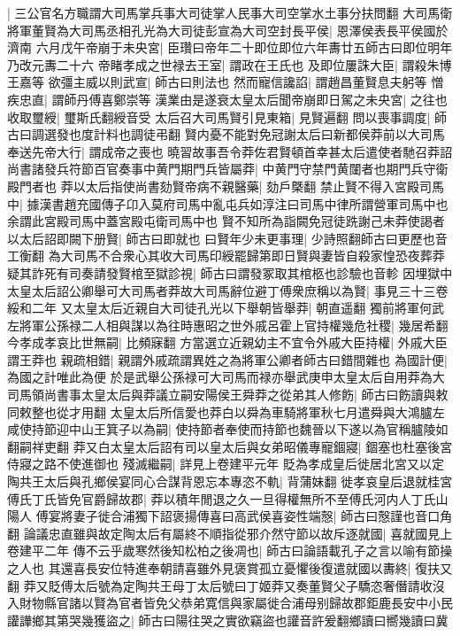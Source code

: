 |{
	三公官名方職謂大司馬掌兵事大司徒掌人民事大司空掌水土事分扶問翻}
大司馬衛將軍董賢為大司馬丞相孔光為大司徒彭宣為大司空封長平侯|{
	恩澤侯表長平侯國於濟南}
六月戊午帝崩于未央宮|{
	臣瓚曰帝年二十即位即位六年夀廿五師古曰即位明年乃改元夀二十六}
帝睹孝成之世禄去王室|{
	謂政在王氏也}
及即位屢誅大臣|{
	謂殺朱博王嘉等}
欲彊主威以則武宣|{
	師古曰則法也}
然而寵信讒諂|{
	謂趙昌董賢息夫躬等}
憎疾忠直|{
	謂師丹傅喜鄭崇等}
漢業由是遂衰太皇太后聞帝崩即日駕之未央宮|{
	之往也}
收取璽綬|{
	璽斯氏翻綬音受}
太后召大司馬賢引見東箱|{
	見賢遍翻}
問以喪事調度|{
	師古曰調選發也度計料也調徒弔翻}
賢内憂不能對免冠謝太后曰新都侯莽前以大司馬奉送先帝大行|{
	謂成帝之喪也}
曉習故事吾令莽佐君賢頓首幸甚太后遣使者馳召莽詔尚書諸發兵符節百官奏事中黄門期門兵皆屬莽|{
	中黄門守禁門黄闥者也期門兵守衛殿門者也}
莽以太后指使尚書劾賢帝病不親醫藥|{
	劾戶槩翻}
禁止賢不得入宮殿司馬中|{
	據漢書趙充國傳子卬入莫府司馬中亂屯兵如淳注曰司馬中律所謂營軍司馬中也余謂此宮殿司馬中蓋宮殿屯衛司馬中也}
賢不知所為詣闕免冠徒跣謝己未莽使謁者以太后詔即闕下册賢|{
	師古曰即就也}
曰賢年少未更事理|{
	少詩照翻師古曰更歷也音工衡翻}
為大司馬不合衆心其收大司馬印綬罷歸第即日賢與妻皆自殺家惶恐夜葬莽疑其詐死有司奏請發賢棺至獄診視|{
	師古曰謂發冢取其棺柩也診驗也音軫}
因埋獄中太皇太后詔公卿舉可大司馬者莽故大司馬辭位避丁傅衆庶稱以為賢|{
	事見三十三卷綏和二年}
又太皇太后近親自大司徒孔光以下舉朝皆舉莽|{
	朝直遥翻}
獨前將軍何武左將軍公孫禄二人相與謀以為往時惠昭之世外戚呂霍上官持權幾危社稷|{
	幾居希翻}
今孝成孝哀比世無嗣|{
	比頻寐翻}
方當選立近親幼主不宜令外戚大臣持權|{
	外戚大臣謂王莽也}
親疏相錯|{
	親謂外戚疏謂異姓之為將軍公卿者師古曰錯間雜也}
為國計便|{
	為國之計唯此為便}
於是武舉公孫禄可大司馬而禄亦舉武庚申太皇太后自用莽為大司馬領尚書事太皇太后與莽議立嗣安陽侯王舜莽之從弟其人修飭|{
	師古曰飭讀與敕同敕整也從才用翻}
太皇太后所信愛也莽白以舜為車騎將軍秋七月遣舜與大鴻臚左咸使持節迎中山王箕子以為嗣|{
	使持節者奉使而持節也魏晉以下遂以為官稱臚陵如翻嗣祥吏翻}
莽又白太皇太后詔有司以皇太后與女弟昭儀專寵錮寢|{
	錮塞也杜塞後宮侍寢之路不使進御也}
殘滅繼嗣|{
	詳見上卷建平元年}
貶為孝成皇后徙居北宮又以定陶共王太后與孔鄉侯宴同心合謀背恩忘本專恣不軌|{
	背蒲妹翻}
徙孝哀皇后退就桂宮傅氏丁氏皆免官爵歸故郡|{
	莽以積年閒退之久一旦得權無所不至傅氏河内人丁氏山陽人}
傅宴將妻子徙合浦獨下詔褒揚傳喜曰高武侯喜姿性端慤|{
	師古曰慤謹也音口角翻}
論議忠直雖與故定陶太后有屬終不順指從邪介然守節以故斥逐就國|{
	喜就國見上卷建平二年}
傳不云乎歲寒然後知松柏之後凋也|{
	師古曰論語載孔子之言以喻有節操之人也}
其還喜長安位特進奉朝請喜雖外見褒賞孤立憂懼後復遣就國以夀終|{
	復扶又翻}
莽又貶傅太后號為定陶共王母丁太后號曰丁姬莽又奏董賢父子驕恣奢僭請收沒入財物縣官諸以賢為官者皆免父恭弟寛信與家屬徙合浦母别歸故郡鉅鹿長安中小民讙譁鄉其第哭幾獲盜之|{
	師古曰陽往哭之實欲竊盜也讙音許爰翻鄉讀曰嚮幾讀曰冀}
